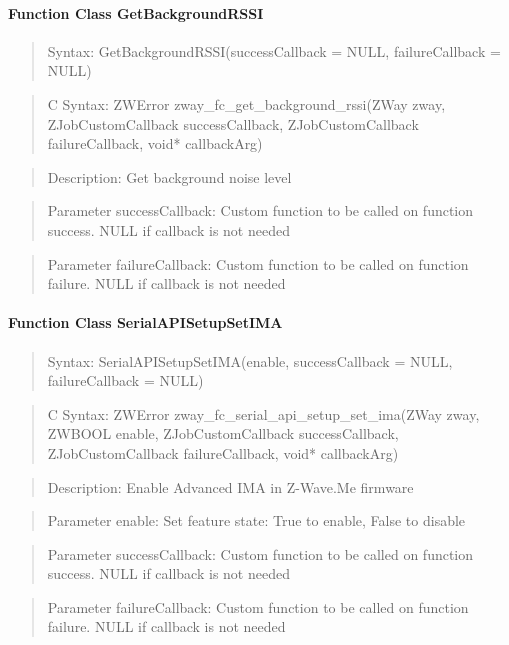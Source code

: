 \paragraph{Function Class GetBackgroundRSSI}
\begin{quote}Syntax: GetBackgroundRSSI(successCallback = NULL, failureCallback = NULL)\end{quote}
\begin{quote}C Syntax: ZWError zway\_fc\_get\_background\_rssi(ZWay zway, ZJobCustomCallback successCallback, ZJobCustomCallback failureCallback, void* callbackArg)\end{quote}
\begin{quote}Description: Get background noise level\end{quote}
\begin{quote}Parameter successCallback: Custom function to be called on function success. NULL if callback is not needed\end{quote}
\begin{quote}Parameter failureCallback: Custom function to be called on function failure. NULL if callback is not needed\end{quote}


\paragraph{Function Class SerialAPISetupSetIMA}
\begin{quote}Syntax: SerialAPISetupSetIMA(enable, successCallback = NULL, failureCallback = NULL)\end{quote}
\begin{quote}C Syntax: ZWError zway\_fc\_serial\_api\_setup\_set\_ima(ZWay zway, ZWBOOL enable, ZJobCustomCallback successCallback, ZJobCustomCallback failureCallback, void* callbackArg)\end{quote}
\begin{quote}Description: Enable Advanced IMA in Z-Wave.Me firmware\end{quote}
\begin{quote}Parameter enable: Set feature state: True to enable, False to disable\end{quote}
\begin{quote}Parameter successCallback: Custom function to be called on function success. NULL if callback is not needed\end{quote}
\begin{quote}Parameter failureCallback: Custom function to be called on function failure. NULL if callback is not needed\end{quote}


